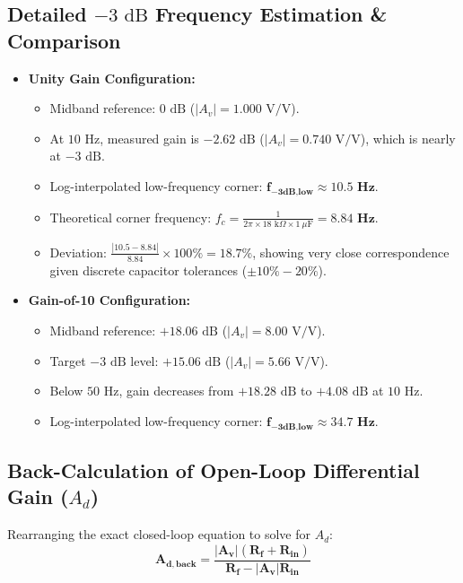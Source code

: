 \documentclass[11pt,a4paper]{article}
\begin{document}
\subsection{Detailed $-3\text{ dB}$ Frequency Estimation \& Comparison}
\begin{itemize}
    \item \textbf{Unity Gain Configuration:}
    \begin{itemize}
        \item Midband reference: $0\text{ dB}$ ($|A_v| = 1.000\text{ V/V}$).
        \item At $10\text{ Hz}$, measured gain is $-2.62\text{ dB}$ ($|A_v| = 0.740\text{ V/V}$), which is nearly at $-3\text{ dB}$.
        \item Log-interpolated low-frequency corner: $\mathbf{f_{-3\text{dB,low}} \approx 10.5\text{ Hz}}$.
        \item Theoretical corner frequency: $f_c = \frac{1}{2\pi \times 18\text{ k}\Omega \times 1\ \mu\text{F}} = \mathbf{8.84\text{ Hz}}$.
        \item Deviation: $\frac{|10.5 - 8.84|}{8.84} \times 100\% = \mathbf{18.7\%}$, showing very close correspondence given discrete capacitor tolerances ($\pm 10\% - 20\%$).
    \end{itemize}
    \item \textbf{Gain-of-10 Configuration:}
    \begin{itemize}
        \item Midband reference: $+18.06\text{ dB}$ ($|A_v| = 8.00\text{ V/V}$).
        \item Target $-3\text{ dB}$ level: $+15.06\text{ dB}$ ($|A_v| = 5.66\text{ V/V}$).
        \item Below $50\text{ Hz}$, gain decreases from $+18.28\text{ dB}$ to $+4.08\text{ dB}$ at $10\text{ Hz}$.
        \item Log-interpolated low-frequency corner: $\mathbf{f_{-3\text{dB,low}} \approx 34.7\text{ Hz}}$.
    \end{itemize}
\end{itemize}

\subsection{Back-Calculation of Open-Loop Differential Gain ($A_d$)}
Rearranging the exact closed-loop equation to solve for $A_d$:
\begin{equation}
    \mathbf{A_{d,back}} = \mathbf{\frac{|A_v| (R_f + R_{in})}{R_f - |A_v| R_{in}}}
    \label{eq:ad_back}
\end{equation}
\end{document}

